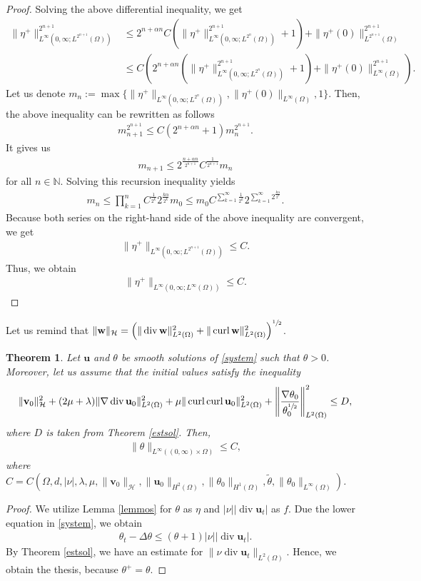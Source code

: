 \documentclass[11pt]{article}
\numberwithin{equation}{section}
\theoremstyle{plain}
\newtheorem{tw}[defi]{Theorem}
\newcommand\bb[1]{\mathbf{#1}}
\newcommand{\n}{\mathbb{N}}
\newcommand{\tn}{\Omega}
\newcommand{\htwo}{H^2(\Omega)}
\renewcommand{\hom}{H^1(\tn)}
\newcommand{\ld}{L^2(\Omega)}
\newcommand{\sul}{\sfrac{1}{2}}
\renewcommand{\div}{\operatorname{div}}
\DeclareMathOperator{\curl}{curl}
\newcommand{\initcond}{\|\bb{v}_0\|^2_{\H}+(2\mu+\lambda)\|\nabla\div\bb u_0\|^2_{\ld}+\mu\|\curl\curl\bb u_0\|_{\ld}^2+\left\|\frac{\nabla\theta_0}{{\theta^{\sul}_0}}\right\|^2_{\ld}\leq D}
\newcommand{\bu}{\bb{u}}
\renewcommand{\H}{\mathcal{H}}
\begin{document}
\begin{proof}
Solving the above differential inequality, we get
\begin{align*}
\|\eta^+\|_{L^{\infty}(0,\infty;L^{2^{n+1}}(\Omega))}^{2^{n+1}}&\leq 2^{n+\alpha n}C(\|\eta^+\|_{L^{\infty}(0,\infty;L^{2^{n}}(\Omega))}^{2^{n+1}}+1)+\|\eta^+(0)\|_{L^{2^{n+1}}(\Omega)}^{2^{n+1}}\\
&\leq C (2^{n+\alpha n}(\|\eta^+\|_{L^{\infty}(0,\infty;L^{2^{n}}(\Omega))}^{2^{n+1}}+1)+\|\eta^+(0)\|_{L^{\infty}(\Omega)}^{2^{n+1}}).
\end{align*}
Let us denote $m_n:=\max\{\|\eta^+\|_{L^{\infty}(0,\infty;L^{2^{n}}(\Omega))},\|\eta^+(0)\|_{L^{\infty}(\Omega)},1\}$. Then, the above inequality can be rewritten as follows
\begin{align*}
m_{n+1}^{2^{n+1}}\leq C(2^{n+\alpha n}+1)m_n^{2^{n+1}}.
\end{align*}
It gives us
\begin{align*}
m_{n+1}\leq 2^{\frac{n+\alpha n}{2^{n+1}}}C^{\frac1{2^{n+1}}}m_n
\end{align*}
for all $n\in\n$. Solving this recursion inequality yields
\begin{align*}
m_n\leq \prod_{k=1}^n C^{\frac1 {2^k}}2^{\frac{k\alpha}{2^k}}m_0\leq m_0C^{\sum_{k=1}^{\infty}\frac1{2^k}}2^{\sum_{k=1}^{\infty}2^{\frac{k\alpha}{2^k}}}.
\end{align*}
Because both series on the right-hand side of the above inequality are convergent, we get
\begin{align*}
\|\eta^+\|_{L^{\infty}(0,\infty;L^{2^{n+1}}(\Omega))}\leq C.
\end{align*}
Thus, we obtain
\begin{align*}
\|\eta^+\|_{L^{\infty}(0,\infty;L^{\infty}(\Omega))}\leq C.
\end{align*}
\end{proof}

Let us remind that $\|\bb w\|_{\H}=\left(\|\div\bb w\|_{\ld}^2+\|\curl\bb w\|_{\ld}^2\right)^{\sul}$.
\begin{tw}\label{upbofortemp}
Let $\bu$ and $\theta$ be smooth solutions of \eqref{system} such that $\theta>0$. Moreover, let us assume that the initial values satisfy the inequality
\begin{align*}
\initcond,
\end{align*}
where $D$ is taken from Theorem \ref{estsol}. Then,
\begin{align*}
\|\theta\|_{L^{\infty}((0,\infty)\times\tn)}\leq C,
\end{align*}
where $C=C(\Omega,d,|\nu|,\lambda,\mu,\| \bb v_0\|_{\H}, \|\bu_0\|_{\htwo}, \|\theta_0\|_{\hom}, \tilde\theta,\|\theta_0\|_{L^{\infty}(\Omega)})$.
\end{tw}
\begin{proof}
We utilize Lemma \ref{lemmos} for $\theta$ as $\eta$ and $|\nu||\div\bu_t|$ as $f$. Due the lower equation in \eqref{system}, we obtain
\begin{align*}
\theta_t-\Delta\theta\leq (\theta+1)|\nu||\div\bu_t|.
\end{align*}
By Theorem \ref{estsol}, we have an estimate for $\|\nu\div\bu_t\|_{\ld}$. Hence, we obtain the thesis, because $\theta^+=\theta$.
\end{proof}
\end{document}
